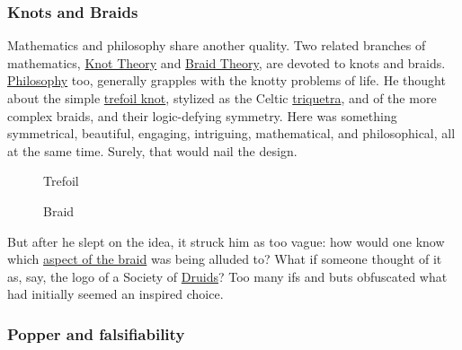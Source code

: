 \documentclass[
  a4paper,
]{article}
\begin{document}
\hypertarget{knots-and-braids}{%
\subsubsection{Knots and Braids}\label{knots-and-braids}}

Mathematics and philosophy share another quality. Two related branches
of mathematics, \href{https://en.wikipedia.org/wiki/Knot_theory}{Knot
Theory} and
\href{https://encyclopediaofmath.org/wiki/Braid_theory}{Braid Theory},
are devoted to knots and braids.
\href{https://www.britannica.com/topic/philosophy}{Philosophy} too,
generally grapples with the knotty problems of life. He thought about
the simple \href{https://mathworld.wolfram.com/TrefoilKnot.html}{trefoil
knot}, stylized as the Celtic
\href{https://en.wikipedia.org/wiki/Triquetra}{triquetra}, and of the
more complex braids, and their logic-defying symmetry. Here was
something symmetrical, beautiful, engaging, intriguing, mathematical,
and philosophical, all at the same time. Surely, that would nail the
design.

\begin{figure}[h]
  \begin{minipage}[b]{0.5\linewidth}
    \centering
    
  \end{minipage}\hfill
  \begin{minipage}[b]{0.5\linewidth}
    \centering
    
  \end{minipage}
\end{figure}

\begin{figure}
\centering

\caption{Trefoil}
\end{figure}

\begin{figure}
\centering

\caption{Braid}
\end{figure}

But after he slept on the idea, it struck him as too vague: how would
one know which \href{http://symboldictionary.net/?p=159}{aspect of the
braid} was being alluded to? What if someone thought of it as, say, the
logo of a Society of
\href{https://www.britannica.com/topic/Druid}{Druids}? Too many ifs and
buts obfuscated what had initially seemed an inspired choice.

\hypertarget{popper-and-falsifiability}{%
\subsubsection{Popper and
falsifiability}\label{popper-and-falsifiability}}
\end{document}
